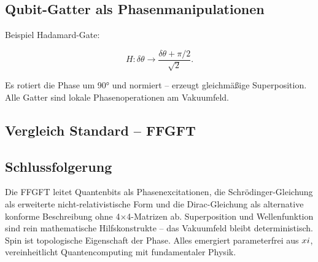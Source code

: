 	\subsection*{Qubit-Gatter als Phasenmanipulationen}
	
	Beispiel Hadamard-Gate:
	
	\begin{equation}
		H: \delta \theta \to \frac{\delta \theta + \pi/2}{\sqrt{2}}.
	\end{equation}
	
	Es rotiert die Phase um 90° und normiert – erzeugt gleichmäßige Superposition. Alle Gatter sind lokale Phasenoperationen am Vakuumfeld.
	
	\subsection*{Vergleich Standard – FFGFT}
	
	\begin{center}
		\small
	\end{center}
	
	\subsection*{Schlussfolgerung}
	
	Die FFGFT leitet Quantenbits als Phasenexcitationen, die Schrödinger-Gleichung als erweiterte nicht-relativistische Form und die Dirac-Gleichung als alternative konforme Beschreibung ohne 4×4-Matrizen ab. Superposition und Wellenfunktion sind rein mathematische Hilfskonstrukte – das Vakuumfeld bleibt deterministisch. Spin ist topologische Eigenschaft der Phase. Alles emergiert parameterfrei aus \(xi\), vereinheitlicht Quantencomputing mit fundamentaler Physik.



